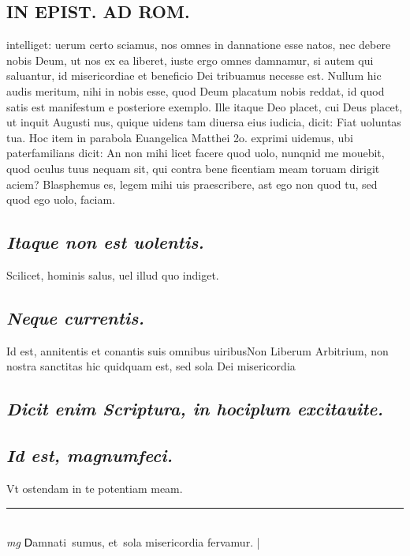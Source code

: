 \documentclass{article}
\begin{document}
\begin{pages}
\section*{IN EPIST. AD ROM.  }
\marginpar{[ p.112 ]}\pstart intelliget: uerum certo sciamus, nos omnes in dannatione esse natos, nec debere nobis Deum, ut nos ex ea liberet, iuste ergo omnes damnamur, si autem qui saluantur, id misericordiae et beneficio Dei tribuamus necesse est. Nullum hic audis meritum, nihi in nobis esse, quod Deum placatum nobis reddat, id quod satis est manifestum e posteriore exemplo. Ille itaque Deo placet, cui Deus placet, ut inquit Augusti nus, quique uidens tam diuersa eius iudicia, dicit: Fiat uoluntas tua. Hoc item in parabola Euangelica Matthei 2o. exprimi uidemus, ubi paterfamilians dicit: An non mihi licet facere quod uolo, nunqnid me mouebit, quod oculus tuus nequam sit, qui contra bene ficentiam meam toruam dirigit aciem? Blasphemus es, legem mihi uis praescribere, ast ego non quod tu, sed quod ego uolo, faciam.  \pend
{}
{}
\subsection*{\textit{Itaque non est uolentis. }}\pstart Scilicet, hominis salus, uel illud quo indiget.  \pend
{}
{}
\subsection*{\textit{Neque currentis. }}\pstart Id est, annitentis et conantis suis omnibus uiribusNon Liberum Arbitrium, non nostra sanctitas hic quidquam est, sed sola Dei misericordia\pend
{}
{}
\subsection*{\textit{Dicit enim Scriptura, in hociplum excitauite. }}
{}
\subsection*{\textit{Id est, magnumfeci.  }}\pstart Vt ostendam in te potentiam meam.  \pend
\vspace{0.5cm}\noindent
\vspace{0.2cm}\rule{1cm}{0.2pt}\\ 
\hspace{0.2cm}\textit{mg}
\footnotesize ᗞamnati sumus, et sola misericordia fervamur.  
\normalsize| 

\end{pages}
\end{document}
